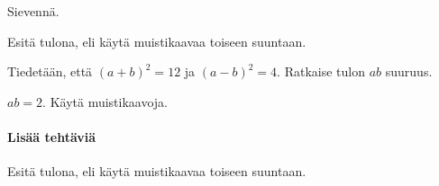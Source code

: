 \begin{tehtavasivu}
\begin{tehtava}
    Sievennä.
    \begin{alakohdat}
    \end{alakohdat}
    \begin{vastaus}
        \begin{alakohdat}
        \end{alakohdat}
    \end{vastaus}
\end{tehtava}

\begin{tehtava}
    Esitä tulona, eli käytä muistikaavaa toiseen suuntaan.
    \begin{alakohdat}
    \end{alakohdat}
    \begin{vastaus}
        \begin{alakohdat}
        \end{alakohdat}
    \end{vastaus}
\end{tehtava}


\begin{tehtava}
	Tiedetään, että $(a+b)^2=12$ ja $(a-b)^2=4$. Ratkaise tulon $ab$ suuruus.
    \begin{vastaus}
	$ab = 2$. Käytä muistikaavoja.
    \end{vastaus}
\end{tehtava}


\paragraph*{Lisää tehtäviä}

\begin{tehtava}
    Esitä tulona, eli käytä muistikaavaa toiseen suuntaan.
    \begin{alakohdat}
    \end{alakohdat}
    \begin{vastaus}
        \begin{alakohdat}
        \end{alakohdat}
    \end{vastaus}
\end{tehtava}


\end{tehtavasivu}
